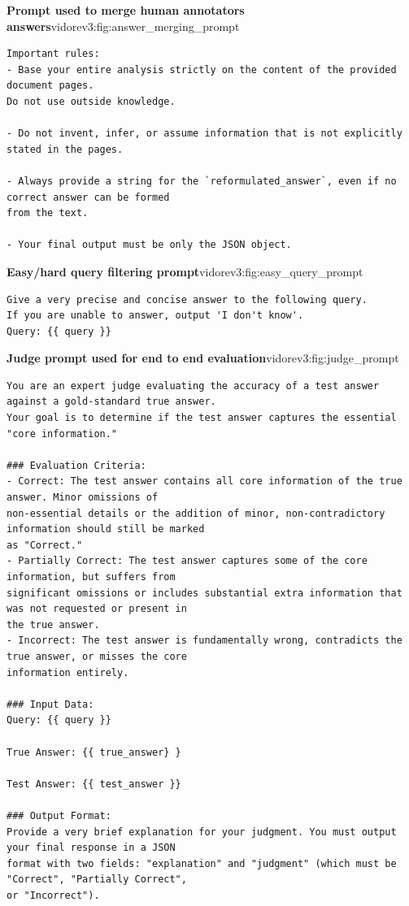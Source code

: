 \begin{promptfigure}{\textbf{Prompt used to merge human annotators answers}}{vidorev3:fig:answer_merging_prompt}
\begin{Verbatim}[breaklines=true,breakanywhere=true,fontsize=\scriptsize]
Important rules:
- Base your entire analysis strictly on the content of the provided document pages. 
Do not use outside knowledge.

- Do not invent, infer, or assume information that is not explicitly stated in the pages.

- Always provide a string for the `reformulated_answer`, even if no correct answer can be formed
from the text.

- Your final output must be only the JSON object.
\end{Verbatim}
\end{promptfigure}

\begin{promptfigure}{\textbf{Easy/hard query filtering prompt}}{vidorev3:fig:easy_query_prompt}
\begin{Verbatim}[breaklines=true,breakanywhere=true,fontsize=\scriptsize]
Give a very precise and concise answer to the following query.
If you are unable to answer, output 'I don't know'.
Query: {{ query }}
\end{Verbatim}
\end{promptfigure}

\begin{promptfigure}{\textbf{Judge prompt used for end to end evaluation}}{vidorev3:fig:judge_prompt}
\begin{Verbatim}[breaklines=true,breakanywhere=true,fontsize=\scriptsize]
You are an expert judge evaluating the accuracy of a test answer against a gold-standard true answer.
Your goal is to determine if the test answer captures the essential "core information."

### Evaluation Criteria:
- Correct: The test answer contains all core information of the true answer. Minor omissions of
non-essential details or the addition of minor, non-contradictory information should still be marked
as "Correct."
- Partially Correct: The test answer captures some of the core information, but suffers from
significant omissions or includes substantial extra information that was not requested or present in
the true answer.
- Incorrect: The test answer is fundamentally wrong, contradicts the true answer, or misses the core
information entirely.

### Input Data:
Query: {{ query }}

True Answer: {{ true_answer} }

Test Answer: {{ test_answer }}

### Output Format:
Provide a very brief explanation for your judgment. You must output your final response in a JSON
format with two fields: "explanation" and "judgment" (which must be "Correct", "Partially Correct",
or "Incorrect").
\end{Verbatim}
\end{promptfigure}

